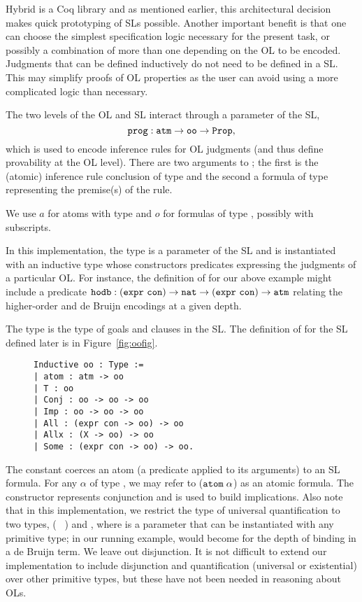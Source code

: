 Hybrid is a Coq library and as mentioned earlier, this architectural decision makes quick prototyping of SLs possible. Another important benefit is that one can choose the simplest specification logic necessary for the present task, or possibly a combination of more than one depending on the OL to be encoded. Judgments that can be defined inductively do not need to be defined in a SL. This may simplify proofs of OL properties as the user can avoid using a more complicated logic than necessary.

The two levels of the OL and SL interact through a parameter of the SL,
$$
\texttt{prog} : \texttt{atm} \rightarrow \texttt{oo} \rightarrow \texttt{Prop},
$$
which is used to encode inference rules for OL judgments (and thus define provability at the OL level). There are two arguments to ; the first is the (atomic) inference rule conclusion of type  and the second a formula of type  representing the premise(s) of the rule.

We use $a$ for atoms with type  and $o$ for formulas of type , possibly with subscripts.

In this implementation, the type  is a parameter of the SL and is instantiated with an inductive type whose constructors predicates expressing the judgments of a particular OL. For instance, the definition of  for our above example might include a predicate $\texttt{hodb} : (\texttt{expr}~ \texttt{con}) \rightarrow \texttt{nat} \rightarrow (\texttt{expr}~ \texttt{con}) \rightarrow \texttt{atm}$ relating the higher-order and de Bruijn encodings at a given depth.

The type  is the type of goals and clauses in the SL. The definition of  for the SL defined later is in Figure~\ref{fig:oofig}.
\begin{figure}
\begin{lstlisting}
Inductive oo : Type :=
| atom : atm -> oo
| T : oo
| Conj : oo -> oo -> oo
| Imp : oo -> oo -> oo
| All : (expr con -> oo) -> oo
| Allx : (X -> oo) -> oo
| Some : (expr con -> oo) -> oo.
\end{lstlisting}
\end{figure}
The constant  coerces an atom (a predicate applied to its arguments) to an SL formula. For any $\alpha$ of type , we may refer to ($\texttt{atom} \; \alpha$) as an atomic formula. The constructor  represents conjunction and  is used to build implications. Also note that in this implementation, we restrict the type of universal quantification to two types, (~ ) and , where  is a parameter that can be instantiated with any primitive type; in our running example,  would become  for the depth of binding in a de Bruijn term. We leave out disjunction. It is not difficult to extend our implementation to include disjunction and quantification (universal or existential) over other primitive types, but these have not been needed in reasoning about OLs.

